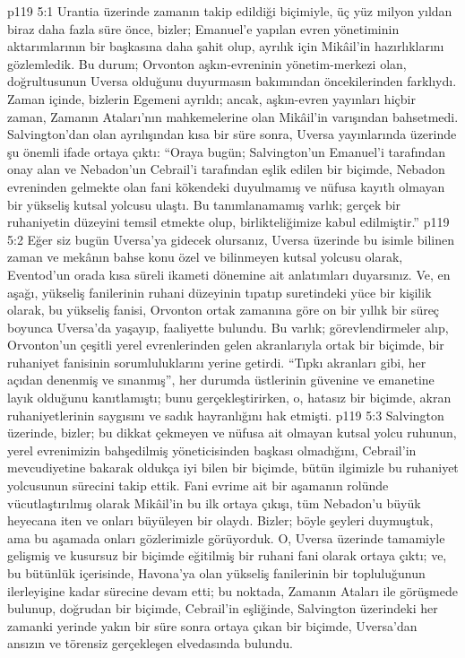 \vs p119 5:1 Urantia üzerinde zamanın takip edildiği biçimiyle, üç yüz milyon yıldan biraz daha fazla süre önce, bizler; Emanuel’e yapılan evren yönetiminin aktarımlarının bir başkasına daha şahit olup, ayrılık için Mikâil’in hazırlıklarını gözlemledik. Bu durum; Orvonton aşkın\hyp{}evreninin yönetim\hyp{}merkezi olan, doğrultusunun Uversa olduğunu duyurmasın bakımından öncekilerinden farklıydı. Zaman içinde, bizlerin Egemeni ayrıldı; ancak, aşkın\hyp{}evren yayınları hiçbir zaman, Zamanın Ataları’nın mahkemelerine olan Mikâil’in varışından bahsetmedi. Salvington’dan olan ayrılışından kısa bir süre sonra, Uversa yayınlarında üzerinde şu önemli ifade ortaya çıktı: “Oraya bugün; Salvington’un Emanuel’i tarafından onay alan ve Nebadon’un Cebrail’i tarafından eşlik edilen bir biçimde, Nebadon evreninden gelmekte olan fani kökendeki duyulmamış ve nüfusa kayıtlı olmayan bir yükseliş kutsal yolcusu ulaştı. Bu tanımlanamamış varlık; gerçek bir ruhaniyetin düzeyini temsil etmekte olup, birlikteliğimize kabul edilmiştir.”
\vs p119 5:2 Eğer siz bugün Uversa’ya gidecek olursanız, Uversa üzerinde bu isimle bilinen zaman ve mekânın bahse konu özel ve bilinmeyen kutsal yolcusu olarak, Eventod’un orada kısa süreli ikameti dönemine ait anlatımları duyarsınız. Ve, en aşağı, yükseliş fanilerinin ruhani düzeyinin tıpatıp suretindeki yüce bir kişilik olarak, bu yükseliş fanisi, Orvonton ortak zamanına göre on bir yıllık bir süreç boyunca Uversa’da yaşayıp, faaliyette bulundu. Bu varlık; görevlendirmeler alıp, Orvonton’un çeşitli yerel evrenlerinden gelen akranlarıyla ortak bir biçimde, bir ruhaniyet fanisinin sorumluluklarını yerine getirdi. “Tıpkı akranları gibi, her açıdan denenmiş ve sınanmış”, her durumda üstlerinin güvenine ve emanetine layık olduğunu kanıtlamıştı; bunu gerçekleştirirken, o, hatasız bir biçimde, akran ruhaniyetlerinin saygısını ve sadık hayranlığını hak etmişti.
\vs p119 5:3 Salvington üzerinde, bizler; bu dikkat çekmeyen ve nüfusa ait olmayan kutsal yolcu ruhunun, yerel evrenimizin bahşedilmiş yöneticisinden başkası olmadığını, Cebrail’in mevcudiyetine bakarak oldukça iyi bilen bir biçimde, bütün ilgimizle bu ruhaniyet yolcusunun sürecini takip ettik. Fani evrime ait bir aşamanın rolünde vücutlaştırılmış olarak Mikâil’in bu ilk ortaya çıkışı, tüm Nebadon’u büyük heyecana iten ve onları büyüleyen bir olaydı. Bizler; böyle şeyleri duymuştuk, ama bu aşamada onları gözlerimizle görüyorduk. O, Uversa üzerinde tamamiyle gelişmiş ve kusursuz bir biçimde eğitilmiş bir ruhani fani olarak ortaya çıktı; ve, bu bütünlük içerisinde, Havona’ya olan yükseliş fanilerinin bir topluluğunun ilerleyişine kadar sürecine devam etti; bu noktada, Zamanın Ataları ile görüşmede bulunup, doğrudan bir biçimde, Cebrail’in eşliğinde, Salvington üzerindeki her zamanki yerinde yakın bir süre sonra ortaya çıkan bir biçimde, Uversa’dan ansızın ve törensiz gerçekleşen elvedasında bulundu.
